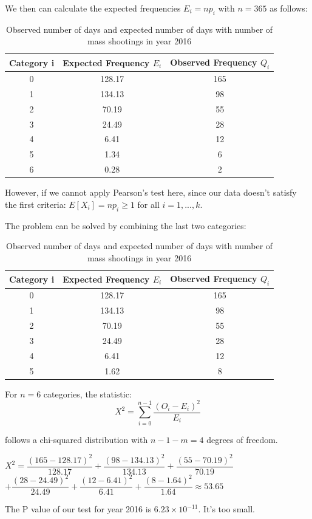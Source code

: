 \documentclass[12pt]{article}
\begin{document}
\par We then can calculate the expected frequencies $E_i=np_i$ with $n=365$ as follows:
\begin{table} [!htbp]
\begin{center}
\begin{tabular*} {14cm} {@{\extracolsep{\fill} }ccc}
\toprule
Category i & Expected Frequency $E_i$ & Observed Frequency $Q_i$ \\
\midrule
0 & 128.17 & 165\\ \hline
1 & 134.13 & 98\\ \hline
2 & 70.19 & 55\\ \hline
3 & 24.49 & 28\\ \hline
4 & 6.41 &  12\\ \hline
5 & 1.34 &  6\\ \hline
6 & 0.28  & 2\\
\bottomrule
\end{tabular*}
\end{center}
\caption{Observed number of days and expected number of days with number of mass shootings in year 2016}
\end{table}
\par However, if we cannot apply Pearson's test here, since our data doesn't satisfy the first criteria: $E[X_i]=np_i\geq1$ for all $i=1,...,k$.
\par The problem can be solved by combining the last two categories:
\begin{table} [!htbp]
\begin{center}
\begin{tabular*} {14cm} {@{\extracolsep{\fill} }ccc}
\toprule
Category i & Expected Frequency $E_i$ & Observed Frequency $Q_i$ \\
\midrule
0 & 128.17 & 165\\ \hline
1 & 134.13 & 98\\ \hline
2 & 70.19 & 55\\ \hline
3 & 24.49 & 28\\ \hline
4 & 6.41 &  12\\ \hline
5 & 1.62 &  8\\
\bottomrule
\end{tabular*}
\end{center}
\caption{Observed number of days and expected number of days with number of mass shootings in year 2016}
\end{table}
\par For $n=6$ categories, the statistic:
\begin{equation*}
X^2=\sum_{i=0}^{n-1}\dfrac{(O_i-E_i)^2}{E_i}
\end{equation*}
\par follows a chi-squared distribution with $n-1-m=4$ degrees of freedom.
\begin{center}
$X^2=\dfrac{(165-128.17)^2}{128.17}+\dfrac{(98-134.13)^2}{134.13}+\dfrac{(55-70.19)^2}{70.19}$\\
$+\dfrac{(28-24.49)^2}{24.49}+\dfrac{(12-6.41)^2}{6.41}+\dfrac{(8-1.64)^2}{1.64}\approx53.65$
\end{center}
\par The P value of our test for year 2016 is $6.23\times 10^{-11}$. It's too small.\\
\end{document}
